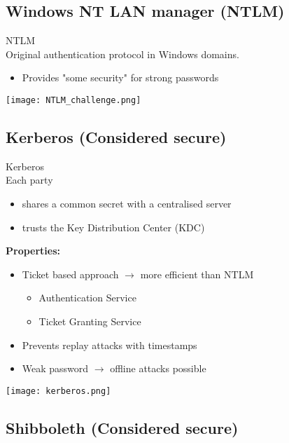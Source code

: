 \subsection{Windows NT LAN manager (NTLM)}

\begin{concept}{NTLM}\\
    Original authentication protocol in Windows domains.
    \begin{itemize}
        \item Provides "some security" for strong passwords
    \end{itemize}
\end{concept}

\texttt{[image: NTLM\_challenge.png]}

\subsection{Kerberos (Considered secure)}

\begin{definition}{Kerberos}\\
    Each party
    \begin{itemize}
        \item shares a common secret with a centralised server
        \item trusts the Key Distribution Center (KDC)
    \end{itemize}
    
    \textbf{Properties:}
    \begin{itemize}
        \item Ticket based approach $\rightarrow$ more efficient than NTLM
        \begin{itemize}
            \item Authentication Service
            \item Ticket Granting Service
        \end{itemize}
        \item Prevents replay attacks with timestamps
        \item Weak password $\rightarrow$ offline attacks possible
    \end{itemize}
\end{definition}

\texttt{[image: kerberos.png]}

\subsection{Shibboleth (Considered secure)}

